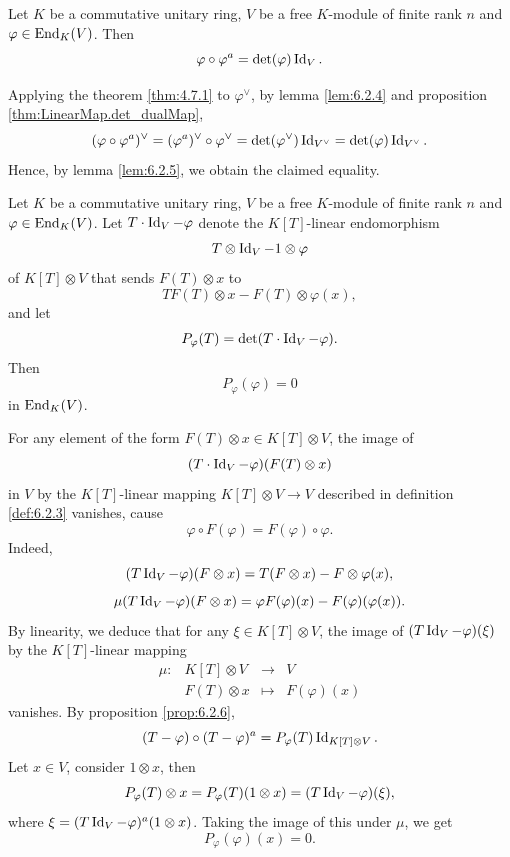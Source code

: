 \begin{propositionenv}\label{prop:6.2.6}
    Let $K$ be a commutative unitary ring,
    $V$ be a free $K$-module of finite rank $n$ and $\varphi \in \operatorname{\mathrm{End}}_{K}(V)$.
    Then
    $$\varphi \circ \varphi^a = \det(\varphi) \operatorname{\mathrm{Id}}_V.$$
\end{propositionenv}
\begin{proofenv}
    Applying the theorem \ref{thm:4.7.1} to $\varphi^\vee$, by lemma \ref{lem:6.2.4} and proposition \ref{thm:LinearMap.det_dualMap}, 
    $$(\varphi \circ \varphi^a)^\vee = (\varphi^a)^\vee \circ \varphi^\vee = \det(\varphi^\vee) \operatorname{\mathrm{Id}}_{V^\vee} = \det(\varphi) \operatorname{\mathrm{Id}}_{V^\vee}.$$
    Hence, by lemma \ref{lem:6.2.5}, we obtain the claimed equality.
\end{proofenv}

\begin{theoremenv}
    Let $K$ be a commutative unitary ring,
    $V$ be a free $K$-module of finite rank $n$ and $\varphi \in \operatorname{\mathrm{End}}_{K}(V)$.
    Let $T \cdot \operatorname{\mathrm{Id}}_{V} - \varphi$ denote the $K[T]$-linear endomorphism
    $$T \otimes \operatorname{\mathrm{Id}}_{V} - 1 \otimes \varphi$$
    of $K[T] \otimes V$ that sends $F(T) \otimes x$ to 
    $$TF(T) \otimes x - F(T) \otimes \varphi(x),$$
    and let
    $$P_\varphi(T) = \det(T \cdot \operatorname{\mathrm{Id}}_{V} - \varphi).$$
    Then
    $$P_\varphi(\varphi) = 0$$
    in $\operatorname{\mathrm{End}}_{K}(V)$.
\end{theoremenv}
\begin{proofenv}
    For any element of the form $F(T) \otimes x \in K[T] \otimes V$,
    the image of 
    $$(T\cdot \operatorname{\mathrm{Id}}_{V} - \varphi)(F(T) \otimes x)$$
    in $V$ by the $K[T]$-linear mapping $K[T] \otimes V \rightarrow V$
    described in definition \ref{def:6.2.3} vanishes, cause
    $$\varphi \circ F(\varphi) = F(\varphi) \circ \varphi.$$
    Indeed,
    $$(T\operatorname{\mathrm{Id}}_{V} - \varphi)(F \otimes x) = T (F \otimes x) - F \otimes \varphi(x),$$
    $$\mu(T \operatorname{\mathrm{Id}}_{V} - \varphi)(F \otimes x) = \varphi F (\varphi)(x) - F(\varphi)(\varphi(x)).$$
    By linearity, we deduce that for any $\xi \in K[T] \otimes V$,
    the image of $(T \operatorname{\mathrm{Id}}_{V} - \varphi) (\xi)$ by the $K[T]$-linear mapping
    $$\begin{array}{rrcl}
        \mu : & K[T] \otimes V & \longrightarrow & V \\
        & F(T) \otimes x & \longmapsto & F(\varphi)(x)
    \end{array}$$
    vanishes.
    By proposition \ref{prop:6.2.6}, 
    $$(T - \varphi) \circ (T - \varphi)^a = P_{\varphi}(T) \operatorname{\mathrm{Id}}_{K[T] \otimes V}.$$
    Let $x \in V$, consider $1 \otimes x$, then
    $$P_{\varphi} (T) \otimes x = P_{\varphi}(T)(1 \otimes x) = (T\operatorname{\mathrm{Id}}_{V} - \varphi)(\xi),$$
    where $\xi = (T\operatorname{\mathrm{Id}}_{V} - \varphi)^a(1 \otimes x)$.
    Taking the image of this under $\mu$, we get
    $$P_{\varphi}(\varphi)(x) = 0.$$
\end{proofenv}

